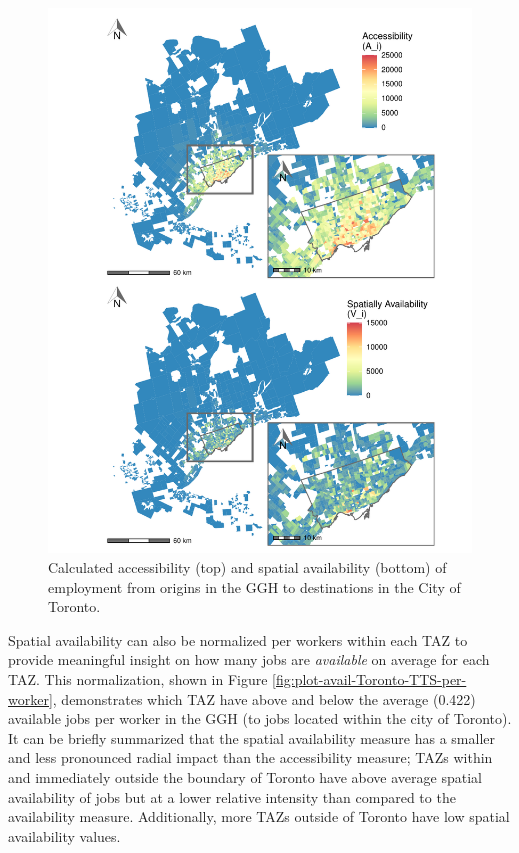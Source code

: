 \documentclass[]{elsarticle} %
\begin{document}
\begin{figure}
\includegraphics[width=1\linewidth]{Spatial-Availability_files/figure-latex/plot-access-SA-Toronto-TTS-1} \caption{\label{fig:plot-access-SA-Toronto-TTS}Calculated accessibility (top) and spatial availability (bottom) of employment from origins in the GGH to destinations in the City of Toronto.}\label{fig:plot-access-SA-Toronto-TTS}
\end{figure}

\newpage

Spatial availability can also be normalized per workers within each TAZ
to provide meaningful insight on how many jobs are \emph{available} on
average for each TAZ. This normalization, shown in Figure
\ref{fig:plot-avail-Toronto-TTS-per-worker}, demonstrates which TAZ have
above and below the average (0.422) available jobs per worker in the GGH
(to jobs located within the city of Toronto). It can be briefly
summarized that the spatial availability measure has a smaller and less
pronounced radial impact than the accessibility measure; TAZs within and
immediately outside the boundary of Toronto have above average spatial
availability of jobs but at a lower relative intensity than compared to
the availability measure. Additionally, more TAZs outside of Toronto
have low spatial availability values.
\end{document}
